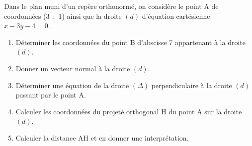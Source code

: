 \medskip

Dans le plan muni d'un repère orthonormé, on considère le point A de coordonnées (3~;~1) ainsi que la droite $(d)$ d'équation cartésienne $x - 3y - 4 = 0$.

\medskip

\begin{enumerate}
\item Déterminer les coordonnées du point B d'abscisse 7 appartenant à la droite $(d)$.
\item Donner un vecteur normal à la droite $(d)$.
\item Déterminer une équation de la droite $(\Delta)$ perpendiculaire à la droite $(d)$ passant par le point A.
\item Calculer les coordonnées du projeté orthogonal H du point A sur la droite $(d)$.
\item Calculer la distance AH et en donner une interprétation.
\end{enumerate}
